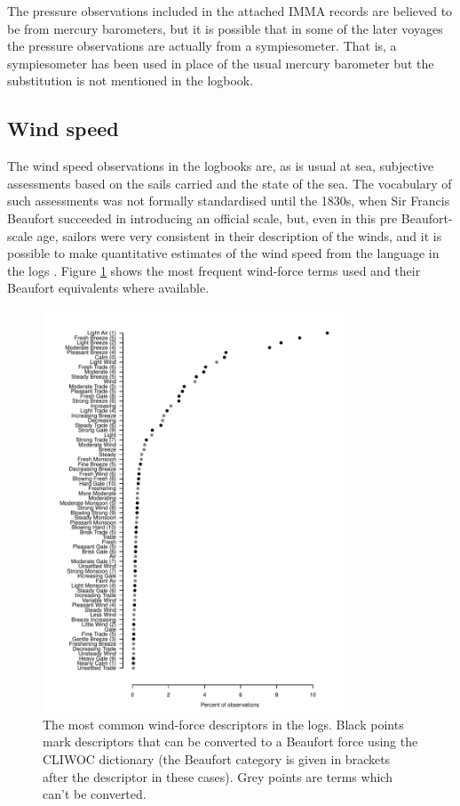 \documentclass[CP]{copernicus}
\begin{document}
The pressure observations included in the attached IMMA records are believed to be from mercury barometers, but it is possible that in some of the later voyages the pressure observations are actually from a sympiesometer. That is, a sympiesometer has been used in place of the usual mercury barometer but the substitution is not mentioned in the logbook.

\subsection{Wind speed}

The wind speed observations in the logbooks are, as is usual at sea, subjective assessments based on the sails carried and the state of the sea. The vocabulary of such assessments was not formally standardised until the 1830s, when Sir Francis Beaufort succeeded in introducing an official scale, but, even in this pre Beaufort-scale age, sailors were very consistent in their description of the winds, and it is possible to make quantitative estimates of the wind speed from the language in the logs \citep{cliwoc03dictionary}. Figure \ref{pwat4} shows the most frequent wind-force terms used and their Beaufort equivalents where available.
\begin{figure}[!hbp]
\begin{center}
\includegraphics[angle=0, width=0.8\textwidth]{../figures/wind_term_frequencies}
\caption{The most common wind-force descriptors in the logs. Black points mark descriptors that can be converted to a Beaufort force using the CLIWOC dictionary (the Beaufort category is given in brackets after the descriptor in these cases). Grey points are terms which can't be converted.}
\label{pwat4}
\end{center}
\end{figure}
\end{document}
